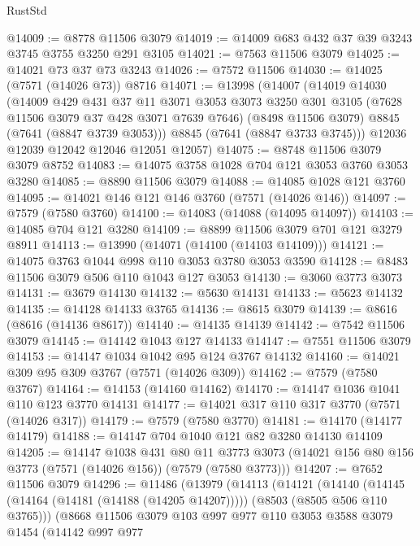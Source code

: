\begin{lexlean}{RustStd}
\begin{coremodule}
@14009 := @8778 @11506 @3079
@14019 := @14009 @683 @432 @37 @39 @3243 @3745 @3755 @3250 @291 @3105
@14021 := @7563 @11506 @3079
@14025 := @14021 @73 @37 @73 @3243
@14026 := @7572 @11506
@14030 := @14025 (@7571 (@14026 @73)) @8716
@14071 := @13998
    (@14007
      (@14019
        @14030
        (@14009
          @429
          @431
          @37
          @11
          @3071
          @3053
          @3073
          @3250
          @301
          @3105
          (@7628 @11506 @3079 @37 @428 @3071 @7639 @7646)
          (@8498 @11506 @3079)
          @8845
          (@7641 (@8847 @3739 @3053)))
        @8845
        (@7641 (@8847 @3733 @3745)))
      @12036
      @12039
      @12042
      @12046
      @12051
      @12057)
@14075 := @8748 @11506 @3079 @3079 @8752
@14083 := @14075 @3758 @1028 @704 @121 @3053 @3760 @3053 @3280
@14085 := @8890 @11506 @3079
@14088 := @14085 @1028 @121 @3760
@14095 := @14021 @146 @121 @146 @3760 (@7571 (@14026 @146))
@14097 := @7579 (@7580 @3760)
@14100 := @14083 (@14088 (@14095 @14097))
@14103 := @14085 @704 @121 @3280
@14109 := @8899 @11506 @3079 @701 @121 @3279 @8911
@14113 := @13990 (@14071 (@14100 (@14103 @14109)))
@14121 := @14075 @3763 @1044 @998 @110 @3053 @3780 @3053 @3590
@14128 := @8483 @11506 @3079 @506 @110 @1043 @127 @3053
@14130 := @3060 @3773 @3073
@14131 := @3679 @14130
@14132 := @5630 @14131
@14133 := @5623 @14132
@14135 := @14128 @14133 @3765
@14136 := @8615 @3079
@14139 := @8616 (@8616 (@14136 @8617))
@14140 := @14135 @14139
@14142 := @7542 @11506 @3079
@14145 := @14142 @1043 @127 @14133
@14147 := @7551 @11506 @3079
@14153 := @14147 @1034 @1042 @95 @124 @3767 @14132
@14160 := @14021 @309 @95 @309 @3767 (@7571 (@14026 @309))
@14162 := @7579 (@7580 @3767)
@14164 := @14153 (@14160 @14162)
@14170 := @14147 @1036 @1041 @110 @123 @3770 @14131
@14177 := @14021 @317 @110 @317 @3770 (@7571 (@14026 @317))
@14179 := @7579 (@7580 @3770)
@14181 := @14170 (@14177 @14179)
@14188 := @14147 @704 @1040 @121 @82 @3280 @14130 @14109
@14205 := @14147
    @1038
    @431
    @80
    @11
    @3773
    @3073
    (@14021 @156 @80 @156 @3773 (@7571 (@14026 @156)) (@7579 (@7580 @3773)))
@14207 := @7652 @11506 @3079
@14296 := @11486
    (@13979
      (@14113
        (@14121
          (@14140
            (@14145 (@14164 (@14181 (@14188 (@14205 @14207)))))
            (@8503 (@8505 @506 @110 @3765)))
          (@8668
            @11506
            @3079
            @103
            @997
            @977
            @110
            @3053
            @3588
            @3079
            @1454
            (@14142
              @997
              @977

\end{coremodule}
\end{lexlean}
